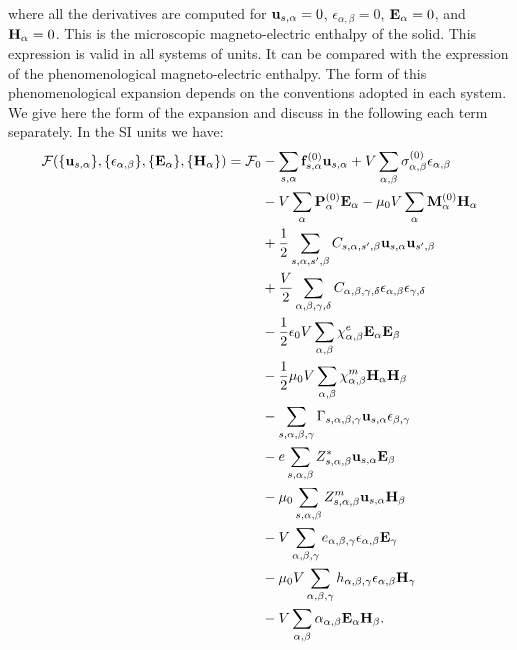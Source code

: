 \documentclass[12pt,a4paper]{article}
\begin{document}
where all the derivatives are computed for ${\bf u}_{s,\alpha}=0$,
$\epsilon_{\alpha,\beta}=0$, ${\bf E}_\alpha=0$, and ${\bf H}_\alpha=0$.
\newpage
This is the microscopic magneto-electric enthalpy of the solid. This 
expression is valid in all systems of units. It can be compared with 
the expression of the 
phenomenological magneto-electric enthalpy. The form of this phenomenological
expansion depends on the conventions adopted in each system. We give here the
form of the expansion and discuss in the following each term separately.
In the SI units we have:
\begin{align}
\mathcal{F}(\{{\bf u}_{s,\alpha}\}, \{\epsilon_{\alpha,\beta}\},
\{ {\bf E}_\alpha\}, \{{\bf H}_\alpha\})=\mathcal{F}_0 &-
\sum_{s,\alpha} {\bf f}^{(0)}_{s,\alpha} {\bf u}_{s,\alpha}+ 
V \sum_{\alpha,\beta}
\sigma^{(0)}_{\alpha,\beta} \epsilon_{\alpha,\beta} \nonumber \\ 
&- V \sum_{\alpha} {\bf P}^{(0)}_\alpha {\bf E}_\alpha - 
\mu_0 V \sum_{\alpha}
{\bf M}^{(0)}_\alpha {\bf H}_\alpha \nonumber \\
&+ {1\over 2}
\sum_{s,\alpha,s',\beta} C_{s,\alpha,s',\beta} {\bf u}_{s,\alpha}
{\bf u}_{s',\beta}\nonumber \\
&+ {V\over 2}\sum_{\alpha,\beta,\gamma,\delta} 
C_{\alpha,\beta,\gamma,\delta}  
\epsilon_{\alpha,\beta}
\epsilon_{\gamma,\delta} \nonumber \\
&- {1\over 2} \epsilon_0 V \sum_{\alpha,\beta} 
\chi^e_{\alpha,\beta}
{\bf E}_{\alpha}
{\bf E}_{\beta} \nonumber \\
&- {1\over 2} \mu_0 V \sum_{\alpha,\beta} 
\chi^m_{\alpha,\beta}
{\bf H}_{\alpha}
{\bf H}_{\beta} \nonumber \\
&- \sum_{s,\alpha,\beta,\gamma}
\Gamma_{s,\alpha,\beta,\gamma} {\bf u}_{s,\alpha}
\epsilon_{\beta,\gamma}\nonumber \\
&- e \sum_{s,\alpha,\beta} Z^*_{s,\alpha,\beta} 
{\bf u}_{s,\alpha} {\bf E}_{\beta} \nonumber \\
&- \mu_0 \sum_{s,\alpha,\beta} 
Z^m_{s,\alpha,\beta} {\bf u}_{s,\alpha}{\bf H}_{\beta} \nonumber \\
&- V \sum_{\alpha,\beta,\gamma} e_{\alpha,\beta,\gamma} 
\epsilon_{\alpha,\beta} {\bf E}_{\gamma} \nonumber \\
&- \mu_0 V \sum_{\alpha,\beta,\gamma}  h_{\alpha,\beta,\gamma} 
\epsilon_{\alpha,\beta} {\bf H}_{\gamma} \nonumber \\
&- V \sum_{\alpha,\beta} \alpha_{\alpha,\beta} {\bf E}_{\alpha}
{\bf H}_{\beta}.
\end{align}
\end{document}
